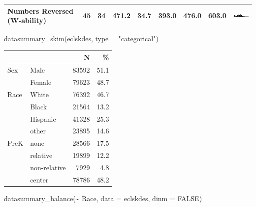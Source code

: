 \documentclass[
]{article}
\newenvironment{Shaded}{\begin{snugshade}}{\end{snugshade}}
\newcommand{\AttributeTok}[1]{\textcolor[rgb]{0.77,0.63,0.00}{#1}}
\newcommand{\ConstantTok}[1]{\textcolor[rgb]{0.00,0.00,0.00}{#1}}
\newcommand{\FunctionTok}[1]{\textcolor[rgb]{0.00,0.00,0.00}{#1}}
\newcommand{\NormalTok}[1]{#1}
\newcommand{\SpecialCharTok}[1]{\textcolor[rgb]{0.00,0.00,0.00}{#1}}
\newcommand{\StringTok}[1]{\textcolor[rgb]{0.31,0.60,0.02}{#1}}
\begin{document}
\begin{table}
\begin{tabular}[t]{lrrrrrrr>{}r}
Numbers Reversed (W-ability) & 45 & 34 & 471.2 & 34.7 & 393.0 & 476.0 & 603.0 & \includegraphics[width=0.67in, height=0.17in]{ECLSKdescriptiveReport_files/figure-latex//hist_736e5f78a55.pdf}\\
\bottomrule
\end{tabular}
\end{table}

\begin{Shaded}
\begin{Highlighting}[]
\FunctionTok{datasummary\_skim}\NormalTok{(eclskdes, }\AttributeTok{type =} \StringTok{"categorical"}\NormalTok{)}
\end{Highlighting}
\end{Shaded}

\begin{table}
\centering
\begin{tabular}[t]{llrr}
\toprule
  &    & N & \%\\
\midrule
Sex & Male & 83592 & 51.1\\
 & Female & 79623 & 48.7\\
Race & White & 76392 & 46.7\\
 & Black & 21564 & 13.2\\
 & Hispanic & 41328 & 25.3\\
 & other & 23895 & 14.6\\
PreK & none & 28566 & 17.5\\
 & relative & 19899 & 12.2\\
 & non-relative & 7929 & 4.8\\
 & center & 78786 & 48.2\\
\bottomrule
\end{tabular}
\end{table}

\begin{Shaded}
\begin{Highlighting}[]
\FunctionTok{datasummary\_balance}\NormalTok{(}\SpecialCharTok{\textasciitilde{}}\NormalTok{ Race, }\AttributeTok{data =}\NormalTok{ eclskdes, }\AttributeTok{dinm =} \ConstantTok{FALSE}\NormalTok{)}
\end{Highlighting}
\end{Shaded}
\end{document}
